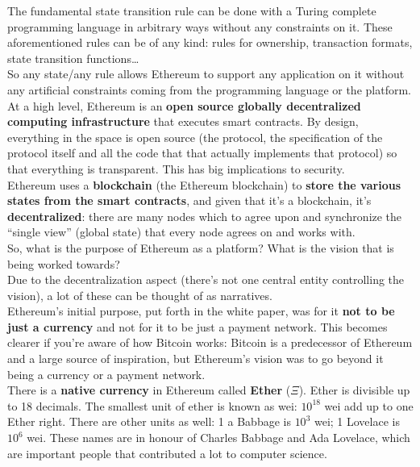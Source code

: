 The fundamental state transition rule can be done with a Turing complete programming language in arbitrary ways without any constraints on it.
These aforementioned rules can be of any kind: rules for ownership, transaction formats, state transition functions\dots\\
So any state/any rule allows Ethereum to support any application on it without any artificial constraints coming from the programming language or the platform.\\

At a high level, Ethereum is an \textbf{open source globally decentralized computing infrastructure} that executes smart contracts.
By design, everything in the space is open source (the protocol, the specification of the protocol itself and all the code that that actually implements that protocol) so that everything is transparent.
This has big implications to security.\\

Ethereum uses a \textbf{blockchain} (the Ethereum blockchain) to \textbf{store the various states from the smart contracts}, and given that it's a blockchain, it's \textbf{decentralized}: there are many nodes which to agree upon and synchronize the ``single view'' (global state) that every node agrees on and works with.\\

So, what is the purpose of Ethereum as a platform?
What is the vision that is being worked towards?\\
Due to the decentralization aspect (there's not one central entity controlling the vision), a lot of these can be thought of as narratives.\\

Ethereum's initial purpose, put forth in the white paper, was for it \textbf{not to be just a currency} and not for it to be just a payment network.
This becomes clearer if you're aware of how Bitcoin works: Bitcoin is a predecessor of Ethereum and a large source of inspiration, but Ethereum's vision was to go beyond it being a currency or a payment network.\\

There is a \textbf{native currency} in Ethereum called \textbf{Ether} ($\Xi$).
Ether is divisible up to 18 decimals.
The smallest unit of ether is known as wei: $10^{18}$ wei add up to one Ether right.
There are other units as well: 1 a Babbage is $10^3$ wei; 1 Lovelace is $10^6$ wei.
These names are in honour of Charles Babbage and Ada Lovelace, which are important people that contributed a lot to computer science.\\

